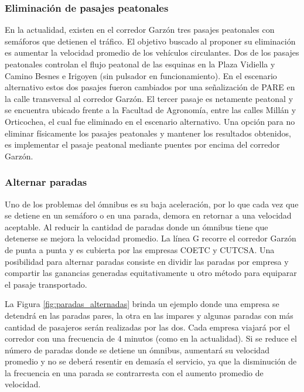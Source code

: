 \newpage

\subsubsection{Eliminación de pasajes peatonales}
En la actualidad, existen en el corredor Garzón tres pasajes peatonales con semáforos que detienen el tráfico. El objetivo buscado al proponer su eliminación es aumentar la velocidad promedio de los vehículos circulantes. Dos de los pasajes peatonales controlan el flujo peatonal de las esquinas en la Plaza Vidiella y Camino Besnes e Irigoyen (sin pulsador en funcionamiento). En el escenario alternativo estos dos pasajes fueron cambiados por una señalización de {PARE} en la calle transversal al corredor Garzón. El tercer pasaje es netamente peatonal y se encuentra ubicado frente a la Facultad de Agronomía, entre las calles Millán y Orticochea, el cual fue eliminado en el escenario alternativo. Una opción para no eliminar físicamente los pasajes peatonales y mantener los resultados obtenidos, es implementar el pasaje peatonal mediante puentes por encima del corredor Garzón.

\subsubsection{Alternar paradas}

Uno de los problemas del ómnibus es su baja aceleración, por lo que cada vez que se detiene en un semáforo o en una parada, demora en retornar a una velocidad aceptable. Al reducir la cantidad de paradas donde un ómnibus tiene que detenerse se mejora la velocidad promedio.
La línea G recorre el corredor Garzón de punta a punta y es cubierta por las empresas COETC y CUTCSA. Una posibilidad para alternar paradas consiste en dividir las paradas por empresa y compartir las ganancias generadas equitativamente u otro método para equiparar el pasaje transportado. 

La Figura \ref{fig:paradas_alternadas} brinda un ejemplo donde una empresa se detendrá en las paradas pares, la otra en las impares y algunas paradas con más cantidad de pasajeros serán realizadas por las dos. Cada empresa viajará por el corredor con una frecuencia de 4 minutos (como en la actualidad). Si se reduce el número de paradas donde se detiene un ómnibus, aumentará su velocidad promedio y no se deberá resentir en demasía el servicio, ya que la disminución de la frecuencia en una parada se contrarresta con el aumento promedio de velocidad.

